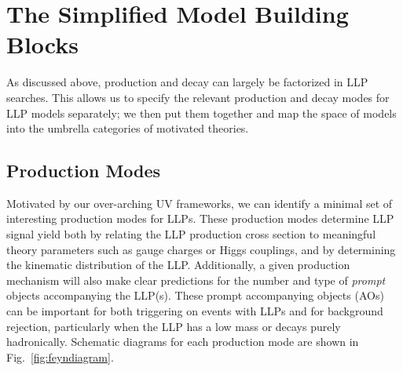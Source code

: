 \section{The Simplified Model Building Blocks}\label{sec:building_blocks}


As discussed above, production and decay can largely be factorized in LLP searches. This allows us to specify the relevant production and decay modes for LLP models separately; we then put them together and map the space of models into the umbrella categories of motivated theories.

\subsection{Production Modes}
\label{SM:secProduction_modes}

Motivated by our over-arching UV frameworks, we can identify a minimal set of interesting production modes for LLPs.
These production modes determine LLP signal yield both by relating the  LLP production cross section to meaningful theory parameters such as gauge charges or Higgs couplings, and by determining the kinematic distribution of the LLP.  Additionally, a given production mechanism will also  make clear predictions for the number and type of {\em prompt} objects accompanying the LLP(s).  These prompt accompanying objects (AOs) can be important for both triggering on events with LLPs and for background rejection, particularly when the LLP has a low mass or decays purely hadronically.  Schematic diagrams for each production mode are shown in Fig.~\ref{fig:feyndiagram}.

